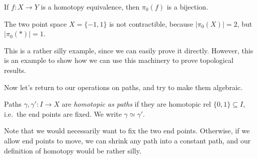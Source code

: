 \documentclass[a4paper]{article}
\begin{document}
\begin{cor}
  If $f: X\to Y$ is a homotopy equivalence, then $\pi_0(f)$ is a bijection.
\end{cor}

\begin{eg}
  The two point space $X = \{-1, 1\}$ is not contractible, because $|\pi_0(X)| = 2$, but $|\pi_0(*)| = 1$.
\end{eg}
This is a rather silly example, since we can easily prove it directly. However, this is an example to show how we can use this machinery to prove topological results.

Now let's return to our operations on paths, and try to make them algebraic.

\begin{defi}
  Paths $\gamma, \gamma': I\to X$ are \emph{homotopic as paths} if they are homotopic rel $\{0, 1\}\subseteq I$, i.e.\ the end points are fixed. We write $\gamma\simeq \gamma'$.
\end{defi}
\begin{center}
\end{center}
Note that we would necessarily want to fix the two end points. Otherwise, if we allow end points to move, we can shrink any path into a constant path, and our definition of homotopy would be rather silly.
\end{document}
